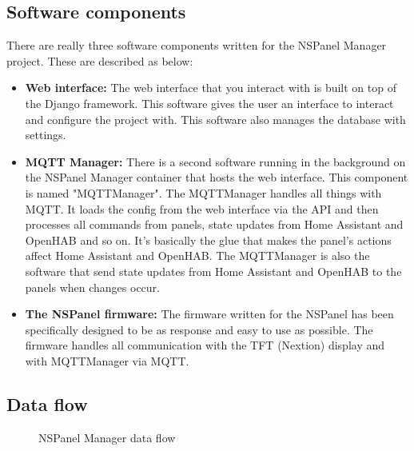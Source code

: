 \documentclass[10pt]{article}
\begin{document}
    \subsection{Software components}
    There are really three software components written for the NSPanel Manager project. These are described as below:
    \begin{itemize}
      \item \textbf{Web interface:} The web interface that you interact with is built on top of the Django framework. This software gives the user an interface to interact and configure the project with. This software also manages the database with settings.
      \item \textbf{MQTT Manager:} There is a second software running in the background on the NSPanel Manager container that hosts the web interface. This component is named "MQTTManager". The MQTTManager handles all things with MQTT. It loads the config from the web interface via the API and then processes all commands from panels, state updates from Home Assistant and OpenHAB and so on. It's basically the glue that makes the panel's actions affect Home Assistant and OpenHAB. The MQTTManager is also the software that send state updates from Home Assistant and OpenHAB to the panels when changes occur.
      \item \textbf{The NSPanel firmware:} The firmware written for the NSPanel has been specifically designed to be as response and easy to use as possible. The firmware handles all communication with the TFT (Nextion) display and with MQTTManager via MQTT.
    \end{itemize}

    \subsection{Data flow}

    \begin{figure}[H]
    \centering
    \caption{NSPanel Manager data flow}%
    \end{figure}
\end{document}
